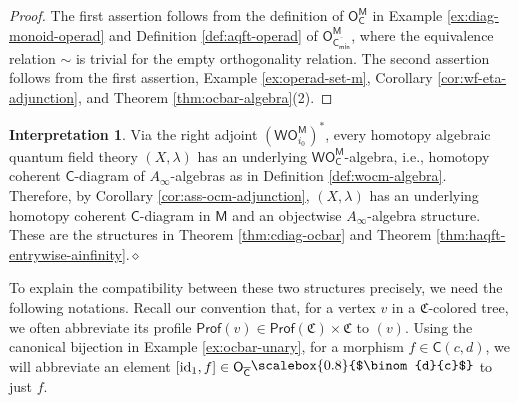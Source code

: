 \documentclass{amsbook}
\numberwithin{section}{chapter}
\numberwithin{subsection}{section}
\numberwithin{equation}{section}
\theoremstyle{plain}
\theoremstyle{definition}
\newtheorem{interpretation}[equation]{Interpretation}
\newcommand{\colorc}{\mathfrak{C}}
\newcommand{\Prof}{\mathsf{Prof}}
\newcommand{\Profc}{\Prof(\colorc)}
\newcommand{\Profcc}{\Profc \times \colorc}
\newcommand{\profofv}{\Prof(v)}
\newcommand{\C}{\mathsf{C}}
\newcommand{\M}{\mathsf{M}}
\renewcommand{\O}{\mathsf{O}}
\newcommand{\Otom}{\O^{\M}}
\newcommand{\W}{\mathsf{W}}
\newcommand{\id}{\mathrm{id}}
\newcommand{\dqed}{\hfill$\diamond$}
\newcommand{\Cbar}{\overline{\C}}
\newcommand{\Cbarmin}{\overline{\C_{\mathsf{min}}}}
\newcommand{\Ocm}{\O_{\C}^{\M}}
\newcommand{\Ocbar}{\O_{\Cbar}}
\newcommand{\Ocbarmin}{\O_{\Cbarmin}}
\newcommand{\Ocbarminm}{\Ocbarmin^{\M}}
\newcommand{\wom}{\W\Otom}
\newcommand{\wocm}{\W\Ocm}
\newcommand{\smallprof}[1]
{\raisebox{.05cm}{\scalebox{0.8}{#1}}}
\newcommand{\dc}{\smallprof{$\binom{d}{c}$}}
\begin{document}
\begin{proof} The first assertion follows from the definition of $\Ocm$ in Example \ref{ex:diag-monoid-operad} and Definition \ref{def:aqft-operad} of $\Ocbarminm$, where the equivalence relation $\sim$ is trivial for the empty orthogonality relation.  The second assertion follows from the first assertion, Example \ref{ex:operad-set-m}, Corollary \ref{cor:wf-eta-adjunction}, and Theorem \ref{thm:ocbar-algebra}(2).
\end{proof}

\begin{interpretation} Via the right adjoint $(\wom_{i_0})^*$, every homotopy algebraic quantum field theory $(X,\lambda)$ has an underlying $\wocm$-algebra, i.e., homotopy coherent $\C$-diagram of $A_\infty$-algebras as in Definition \ref{def:wocm-algebra}.  Therefore, by Corollary \ref{cor:ass-ocm-adjunction}, $(X,\lambda)$ has an underlying homotopy coherent $\C$-diagram in $\M$ and an objectwise $A_\infty$-algebra structure.  These are the structures in Theorem \ref{thm:cdiag-ocbar} and Theorem \ref{thm:haqft-entrywise-ainfinity}.\dqed
\end{interpretation}

To explain the compatibility between these two structures precisely, we need the following notations.  Recall our convention that, for a vertex $v$ in a $\colorc$-colored tree, we often abbreviate its profile $\profofv \in \Profcc$ to  $(v)$.  Using the canonical bijection in Example \ref{ex:ocbar-unary}, for a morphism $f \in \C(c,d)$, we will abbreviate an element $[\id_1,f] \in \Ocbar\dc$ to just $f$.
\end{document}
